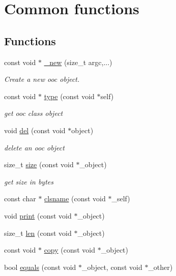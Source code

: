 \hypertarget{group__common}{}\section{Common functions}
\label{group__common}
\subsection*{Functions}
\begin{DoxyCompactItemize}
\item 
const void $\ast$ \mbox{\hyperlink{group__common_ga1c393167a5a06a566a2cc64133c1695f}{\+\_\+new}} (size\+\_\+t argc,...)
\begin{DoxyCompactList}\small\item\em Create a new ooc object. \end{DoxyCompactList}\item 
const void $\ast$ \mbox{\hyperlink{group__common_ga68940c707bbebe6946aeca72df1ee803}{type}} (const void $\ast$self)
\begin{DoxyCompactList}\small\item\em get ooc class object \end{DoxyCompactList}\item 
void \mbox{\hyperlink{group__common_gaa32332a11f6b26468e618db044b95f75}{del}} (const void $\ast$object)
\begin{DoxyCompactList}\small\item\em delete an ooc object \end{DoxyCompactList}\item 
size\+\_\+t \mbox{\hyperlink{group__common_gafac8564ed88a6f8585f043fc6b2fa7e1}{size}} (const void $\ast$\+\_\+object)
\begin{DoxyCompactList}\small\item\em get size in bytes \end{DoxyCompactList}\item 
const char $\ast$ \mbox{\hyperlink{group__common_gadcc35aece3f8a4c822a9bf2a591f087b}{clsname}} (const void $\ast$\+\_\+self)
\item 
void \mbox{\hyperlink{group__common_ga34dc6ab72cfd51381e8173226484e827}{print}} (const void $\ast$\+\_\+object)
\item 
size\+\_\+t \mbox{\hyperlink{group__common_ga15be7f4a5b9c979feb83b76278f6716c}{len}} (const void $\ast$\+\_\+object)
\item 
const void $\ast$ \mbox{\hyperlink{group__common_gab08ed4d7b5aa115383f38057e006be9d}{copy}} (const void $\ast$\+\_\+object)
\item 
bool \mbox{\hyperlink{group__common_ga4b83176929aeea62524d2a126d3c897f}{equals}} (const void $\ast$\+\_\+object, const void $\ast$\+\_\+other)
\end{DoxyCompactItemize}


